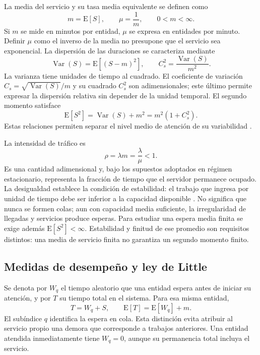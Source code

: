 La media del servicio y su tasa media equivalente se definen como
\begin{equation}
  m=\mathrm{E}[S], \qquad \mu=\frac{1}{m}, \qquad 0<m<\infty.
  \label{eq:media-tasa-servicio}
\end{equation}
Si $m$ se mide en minutos por entidad, $\mu$ se expresa en entidades por minuto. Definir $\mu$ como el inverso de la media no presupone que el servicio sea exponencial. La dispersión de las duraciones se caracteriza mediante
\begin{equation}
  \operatorname{Var}(S)=\mathrm{E}[(S-m)^2],
  \qquad C_s^2=\frac{\operatorname{Var}(S)}{m^2}.
  \label{eq:variabilidad-servicio}
\end{equation}
La varianza tiene unidades de tiempo al cuadrado. El coeficiente de variación $C_s=\sqrt{\operatorname{Var}(S)}/m$ y su cuadrado $C_s^2$ son adimensionales; este último permite expresar la dispersión relativa sin depender de la unidad temporal. El segundo momento satisface
\begin{equation}
  \mathrm{E}[S^2]=\operatorname{Var}(S)+m^2=m^2(1+C_s^2).
  \label{eq:segundo-momento-servicio}
\end{equation}
Estas relaciones permiten separar el nivel medio de atención de su variabilidad \cite{virtamoMG1}.

La intensidad de tráfico es
\begin{equation}
  \rho=\lambda m=\frac{\lambda}{\mu}<1.
  \label{eq:utilizacion-estabilidad}
\end{equation}
Es una cantidad adimensional y, bajo los supuestos adoptados en régimen estacionario, representa la fracción de tiempo que el servidor permanece ocupado. La desigualdad establece la condición de estabilidad: el trabajo que ingresa por unidad de tiempo debe ser inferior a la capacidad disponible \cite{virtamoMG1}. No significa que nunca se formen colas; aun con capacidad media suficiente, la irregularidad de llegadas y servicios produce esperas. Para estudiar una espera media finita se exige además $\mathrm{E}[S^2]<\infty$. Estabilidad y finitud de ese promedio son requisitos distintos: una media de servicio finita no garantiza un segundo momento finito.

\subsection{Medidas de desempeño y ley de Little}
\label{subsec:medidas-little}

Se denota por $W_q$ el tiempo aleatorio que una entidad espera antes de iniciar su atención, y por $T$ su tiempo total en el sistema. Para esa misma entidad,
\begin{equation}
  T=W_q+S, \qquad \mathrm{E}[T]=\mathrm{E}[W_q]+m.
  \label{eq:tiempo-sistema}
\end{equation}
El subíndice $q$ identifica la espera en cola. Esta distinción evita atribuir al servicio propio una demora que corresponde a trabajos anteriores. Una entidad atendida inmediatamente tiene $W_q=0$, aunque su permanencia total incluya el servicio.

